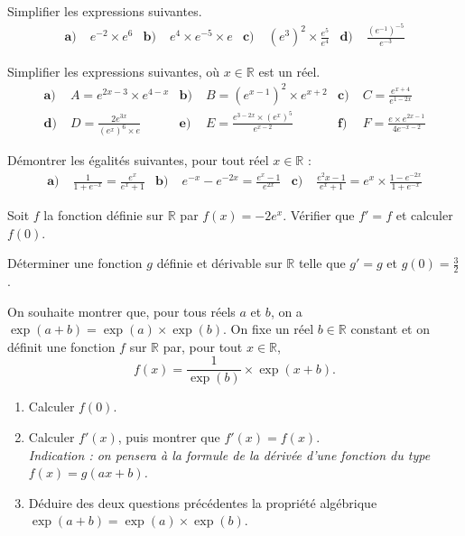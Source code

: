 \documentclass[11pt]{article}
\begin{document}
\begin{exo}
  Simplifier les expressions suivantes.
  \begin{align*}
    \textbf{a)}\;& e^{-2}\times e^6 &
    \textbf{b)}\;& e^4\times e^{-5} \times e &
    \textbf{c)}\;& \left( e^3 \right)^2\times\frac{e^5}{e^4} &
    \textbf{d)}\;& \frac{\left( e^{-1} \right)^{-5}}{e^{-3}}
  \end{align*}
\end{exo}

\begin{exo}
  Simplifier les expressions suivantes, où $x\in\mathbb{R}$ est un réel.
  \begin{align*}
    \textbf{a)}\;& A = e^{2x-3}\times e^{4-x} &
    \textbf{b)}\;& B = (e^{x-1})^2\times e^{x+2} &
    \textbf{c)}\;& C = \frac{e^{x+4}}{e^{1-2x}} \\
    \textbf{d)}\;& D = \frac{2e^{3x}}{\left( e^x \right)^6\times e} &
    \textbf{e)}\;& E = \frac{e^{3-2x}\times\left( e^x \right)^5}{e^{x-2}} &
    \textbf{f)}\;& F = \frac{e\times e^{2x-1}}{4e^{-x-2}}
  \end{align*}
\end{exo}

\begin{exo}
  Démontrer les égalités suivantes, pour tout réel $x\in\mathbb{R}$ :
  \begin{align*}
    \textbf{a)}\;& \frac{1}{1+e^{-x}} = \frac{e^x}{e^x+1} &
    \textbf{b)}\;& e^{-x} - e^{-2x} = \frac{e^x-1}{e^{2x}} &
    \textbf{c)}\;& \frac{e^2x-1}{e^x+1} =
    e^x\times\frac{1-e^{-2x}}{1+e^{-x}}
  \end{align*}
\end{exo}

\begin{exo}
  Soit $f$ la fonction définie sur $\mathbb{R}$ par %
  $f(x) = -2e^x$. Vérifier que $f'=f$ et calculer $f(0)$.
\end{exo}

\begin{exo}
  Déterminer une fonction $g$ définie et dérivable sur $\mathbb{R}$ telle que
  $g'=g$ et $g(0)=\frac{3}{2}$.
\end{exo}

\begin{exo}
  On souhaite montrer que, pour tous réels $a$ et $b$, on a
  $\exp(a+b)=\exp(a)\times\exp(b)$. On fixe un réel $b\in\mathbb{R}$ constant et
  on définit une fonction $f$ sur $\mathbb{R}$ par, pour tout $x\in\mathbb{R}$,
  \[
    f(x) = \frac{1}{\exp(b)}\times\exp(x+b).
  \]
  \begin{enumerate}
    \item Calculer $f(0)$.
    \item Calculer $f'(x)$, puis montrer que $f'(x)=f(x)$.\\\emph{Indication : on
      pensera à la formule de la dérivée d'une fonction du type $f(x)=g(ax+b)$.}
    \item Déduire des deux questions précédentes la propriété algébrique
      $\exp(a+b)=\exp(a)\times\exp(b)$.
  \end{enumerate}
\end{exo}
\end{document}
